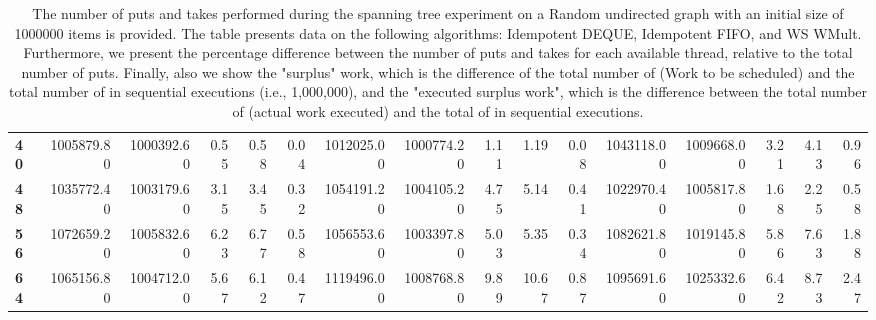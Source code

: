 \begin{table}[!ht]
{\begin{tabular}{lrrrrrrrrrrrrrrr}
\textbf{40} &       1005879.80 & 1000392.60 &           0.55 &        0.58 &                 0.04 &      1012025.00 & 1000774.20 &           1.11 &        1.19 &                 0.08 & 1043118.00 & 1009668.00 &           3.21 &        4.13 &                 0.96 \\
\textbf{48} &       1035772.40 & 1003179.60 &           3.15 &        3.45 &                 0.32 &      1054191.20 & 1004105.20 &           4.75 &        5.14 &                 0.41 & 1022970.40 & 1005817.80 &           1.68 &        2.25 &                 0.58 \\
\textbf{56} &       1072659.20 & 1005832.60 &           6.23 &        6.77 &                 0.58 &      1056553.60 & 1003397.80 &           5.03 &        5.35 &                 0.34 & 1082621.80 & 1019145.80 &           5.86 &        7.63 &                 1.88 \\
\textbf{64} &       1065156.80 & 1004712.00 &           5.67 &        6.12 &                 0.47 &      1119496.00 & 1008768.80 &           9.89 &       10.67 &                 0.87 & 1095691.60 & 1025332.60 &           6.42 &        8.73 &                 2.47 \\
\bottomrule
\end{tabular}}
\label{difference-Random_directed-1000000-IDEMPOTENT_DEQUE-IDEMPOTENT_FIFO-WS_NC_MULT_OPT}
\caption{The number of puts and takes performed during the
    spanning tree experiment on a Random undirected graph with an initial size
    of 1000000 items is provided. The table presents data on the
    following algorithms: Idempotent DEQUE, Idempotent FIFO, and
    WS WMult. Furthermore, we present the percentage difference
    between the number of puts and takes for each available thread,
    relative to the total number of puts. Finally, also we show the
    "surplus" work, which is the difference of the total number of
    \Puts (Work to be scheduled) and the total number of \Puts in
    sequential executions (i.e., 1,000,000), and the "executed surplus
    work", which is the difference between the total number of \Takes
    (actual work executed) and the total of \Takes in sequential
    executions.}
\end{table}
